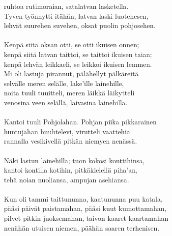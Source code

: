 ruhtoa rutimoraian, satalatvan lasketella.                      \\
Tyven työnnytti itähän, latvan laski luotehesen,                \\
lehvät suurehen suvehen, oksat puolin pohjosehen.               \\
                                                                \\
Kenpä siitä oksan otti, se otti ikuisen onnen;                  \\
kenpä siitä latvan taittoi, se taittoi ikuisen taian;           \\
kenpä lehvän leikkaeli, se leikkoi ikuisen lemmen.              \\
Mi oli lastuja pirannut, pälähellyt pälkäreitä                  \\
selvälle meren selälle, lake'ille lainehille,                   \\
noita tuuli tuuitteli, meren läikkä läikytteli                  \\
venosina veen selällä, laivasina lainehilla.                    \\
                                                                \\
Kantoi tuuli Pohjolahan. Pohjan piika pikkarainen               \\
huntujahan huuhtelevi, virutteli vaattehia                      \\
rannalla vesikivellä pitkän niemyen nenässä.                    \\
                                                                \\
Näki lastun lainehilla; tuon kokosi konttihinsa,                \\
kantoi kontilla kotihin, pitkäkielellä piha'an,                 \\
tehä noian nuoliansa, ampujan asehiansa.                        \\
                                                                \\
Kun oli tammi taittununna, kaatununna puu katala,               \\
pääsi päivät paistamahan, pääsi kuut kumottamahan,              \\
pilvet pitkin juoksemahan, taivon kaaret kaartamahan            \\
nenähän utuisen niemen, päähän saaren terhenisen.               \\
                                                                \\
